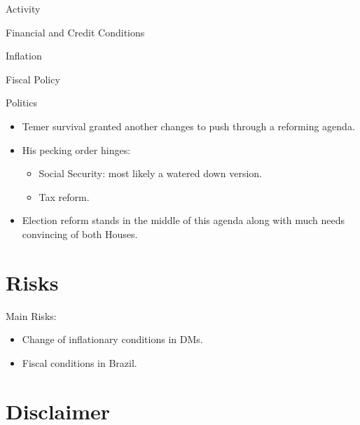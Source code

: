 \documentclass[12pt, presentation, t]{beamer}
\begin{document}
\begin{frame}[label={sec:orgb00d8b5}]{Activity}
\end{frame}
\begin{frame}[label={sec:orgfcb804f}]{Financial and Credit Conditions}
\end{frame}
\begin{frame}[label={sec:org6435493}]{Inflation}
\end{frame}
\begin{frame}[label={sec:org2ca7657}]{Fiscal Policy}
\end{frame}
\begin{frame}[label={sec:orgdd1d64a}]{Politics}
\begin{itemize}
\item Temer survival granted another changes to push through a
reforming agenda.
\item His pecking order hinges:
\begin{itemize}
\item Social Security: most likely a watered down version.
\item Tax reform.
\end{itemize}
\item Election reform stands in the middle of this agenda along with
much needs convincing of both Houses.
\end{itemize}
\end{frame}

\section{Risks}
\label{sec:org4abc11a}
\begin{frame}[label={sec:org2143376}]{Main Risks:}
\begin{itemize}
\item Change of inflationary conditions in DMs.
\item Fiscal conditions in Brazil.
\end{itemize}
\end{frame}



\section{Disclaimer}
\label{sec:orgd39fd48}
\end{document}
